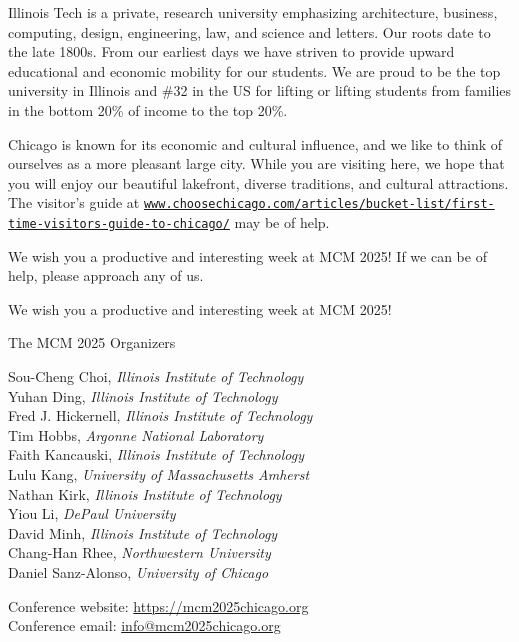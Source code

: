 Illinois Tech is a private, research university emphasizing architecture, business, computing, design, engineering, law, and science and letters.  Our roots date to the late 1800s.  From our earliest days we have striven to provide upward educational and economic mobility for our students.  We are proud to be the top university in Illinois and \#32 in the US for lifting or lifting students from families in the bottom 20\% of income to the top 20\%.

Chicago is known for its economic and cultural influence, and we like to think of ourselves as a more pleasant large city.  
While you are visiting here, we hope that you will enjoy our beautiful lakefront, diverse traditions, and cultural attractions. The visitor's guide at \href{https://www.choosechicago.com/articles/bucket-list/first-time-visitors-guide-to-chicago/}{\nolinkurl{www.choosechicago.com/articles/bucket-list/first-time-visitors-guide-to-chicago/}} may be of help.

We wish you a productive and interesting week at MCM 2025! If we can be of help, please approach any of us.

We wish you a productive and interesting week at MCM 2025!


\vspace{5ex}

The MCM 2025 Organizers 

\smallskip

Sou-Cheng Choi, \emph{Illinois Institute of Technology} \\
Yuhan Ding, \emph{Illinois Institute of Technology} \\
Fred J. Hickernell, \emph{Illinois Institute of Technology} \\
Tim Hobbs, \emph{Argonne National Laboratory} \\
Faith Kancauski, \emph{Illinois Institute of Technology} \\
Lulu Kang, \emph{University of Massachusetts Amherst} \\
Nathan Kirk, \emph{Illinois Institute of Technology} \\
Yiou Li, \emph{DePaul University} \\
David Minh, \emph{Illinois Institute of Technology} \\
Chang-Han Rhee, \emph{Northwestern University} \\
Daniel Sanz-Alonso, \emph{University of Chicago}


\vspace{0.5cm}
Conference website: \url{https://mcm2025chicago.org} \\
Conference email: \url{info@mcm2025chicago.org}

